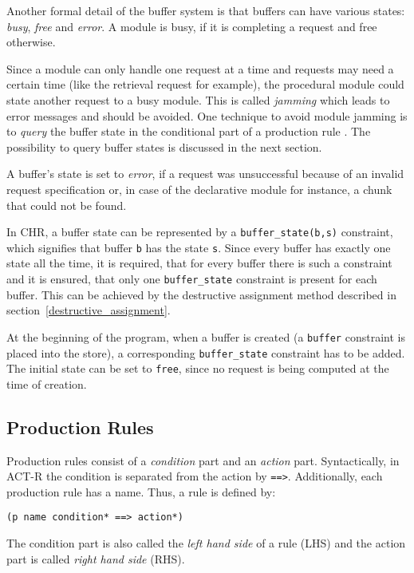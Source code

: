 Another formal detail of the buffer system is that buffers can have various states: \emph{busy}, \emph{free} and \emph{error}. A module is busy, if it is completing a request and free otherwise.

Since a module can only handle one request at a time and requests may need a certain time (like the retrieval request for example), the procedural module could state another request to a busy module. This is called \emph{jamming} which leads to error messages and should be avoided. One technique to avoid module jamming is to \emph{query} the buffer state in the conditional part of a production rule \cite[unit 2, p. 9]{actr_tutorial}. The possibility to query buffer states is discussed in the next section.

A buffer's state is set to \emph{error}, if a request was unsuccessful because of an invalid request specification or, in case of the declarative module for instance, a chunk that could not be found.

In CHR, a buffer state can be represented by a \lstinline|buffer_state(b,s)| constraint, which signifies that buffer \lstinline|b| has the state \lstinline|s|. Since every buffer has exactly one state all the time, it is required, that for every buffer there is such a constraint and it is ensured, that only one \lstinline|buffer_state| constraint is present for each buffer. This can be achieved by the destructive assignment method described in section~\ref{destructive_assignment}. 

At the beginning of the program, when a buffer is created (a \lstinline|buffer| constraint is placed into the store), a corresponding \lstinline|buffer_state| constraint has to be added. The initial state can be set to \lstinline|free|, since no request is being computed at the time of creation.

\subsection{Production Rules}

Production rules consist of a \emph{condition} part and an \emph{action} part. Syntactically, in ACT-R the condition is separated from the action by \lstinline|==>|. Additionally, each production rule has a name. Thus, a rule is defined by:

\begin{verbatim}
(p name condition* ==> action*)
\end{verbatim}

The condition part is also called the \emph{left hand side} of a rule (LHS) and the action part is called \emph{right hand side} (RHS).

